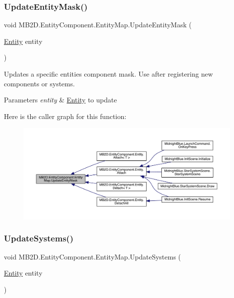 \subsubsection{\texorpdfstring{Update\+Entity\+Mask()}{UpdateEntityMask()}}
{\footnotesize\ttfamily void M\+B2\+D.\+Entity\+Component.\+Entity\+Map.\+Update\+Entity\+Mask (\begin{DoxyParamCaption}\item[{\hyperlink{class_m_b2_d_1_1_entity_component_1_1_entity}{Entity}}]{entity }\end{DoxyParamCaption})\hspace{0.3cm}{\ttfamily [inline]}}



Updates a specific entities component mask. Use after registering new components or systems. 


\begin{DoxyParams}{Parameters}
{\em entity} & \hyperlink{class_m_b2_d_1_1_entity_component_1_1_entity}{Entity} to update\\
\hline
\end{DoxyParams}
Here is the caller graph for this function\+:\nopagebreak
\begin{figure}[H]
\begin{center}
\leavevmode
\includegraphics[width=350pt]{class_m_b2_d_1_1_entity_component_1_1_entity_map_a968ce46cbba14cdc7814dd308f133949_icgraph}
\end{center}
\end{figure}
\hypertarget{class_m_b2_d_1_1_entity_component_1_1_entity_map_ab6078e0b6eddb220b9bbf5d358d6e365}{}\label{class_m_b2_d_1_1_entity_component_1_1_entity_map_ab6078e0b6eddb220b9bbf5d358d6e365} 
\subsubsection{\texorpdfstring{Update\+Systems()}{UpdateSystems()}}
{\footnotesize\ttfamily void M\+B2\+D.\+Entity\+Component.\+Entity\+Map.\+Update\+Systems (\begin{DoxyParamCaption}\item[{\hyperlink{class_m_b2_d_1_1_entity_component_1_1_entity}{Entity}}]{entity }\end{DoxyParamCaption})\hspace{0.3cm}{\ttfamily [inline]}}



